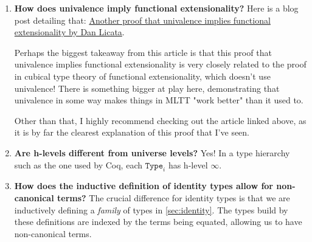 \documentclass{amsart}
\theoremstyle{definition}
\begin{document}
\begin{enumerate}
    \item \textbf{How does univalence imply functional extensionality?} Here is a blog post detailing that: \href{https://homotopytypetheory.org/2014/02/17/another-proof-that-univalence-implies-function-extensionality/}{Another proof that univalence implies functional extensionality by Dan Licata}.

    Perhaps the biggest takeaway from this article is that this proof that univalence implies functional extensionality is very closely related to the proof in cubical type theory of functional extensionality, which doesn't use univalence! There is something bigger at play here, demonstrating that univalence in some way makes things in MLTT "work better" than it used to.

    Other than that, I highly recommend checking out the article linked above, as it is by far the clearest explanation of this proof that I've seen.
    \item \textbf{Are h-levels different from universe levels?} Yes! In a type hierarchy such as the one used by Coq, each $\texttt{Type}_i$ has h-level $\infty$.
    \item \textbf{How does the inductive definition of identity types allow for non-canonical terms?} The crucial difference for identity types is that we are inductively defining a \textit{family} of types in \ref{sec:identity}. The types build by these definitions are indexed by the terms being equated, allowing us to have non-canonical terms.
\end{enumerate}
\end{document}
